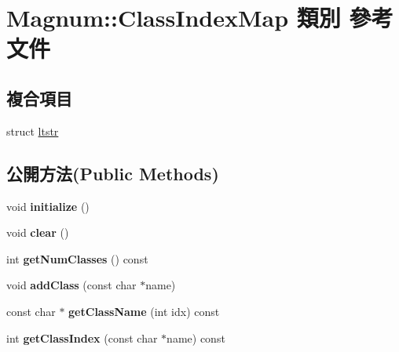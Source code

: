 \hypertarget{class_magnum_1_1_class_index_map}{}\section{Magnum\+:\+:Class\+Index\+Map 類別 參考文件}
\label{class_magnum_1_1_class_index_map}
\subsection*{複合項目}
\begin{DoxyCompactItemize}
\item 
struct \hyperlink{struct_magnum_1_1_class_index_map_1_1ltstr}{ltstr}
\end{DoxyCompactItemize}
\subsection*{公開方法(Public Methods)}
\begin{DoxyCompactItemize}
\item 
void {\bfseries initialize} ()\hypertarget{class_magnum_1_1_class_index_map_a9abde835872cf39a0b240566cbe312ac}{}\label{class_magnum_1_1_class_index_map_a9abde835872cf39a0b240566cbe312ac}

\item 
void {\bfseries clear} ()\hypertarget{class_magnum_1_1_class_index_map_aa3c7d912fb4a6d11d869ae59a807628b}{}\label{class_magnum_1_1_class_index_map_aa3c7d912fb4a6d11d869ae59a807628b}

\item 
int {\bfseries get\+Num\+Classes} () const \hypertarget{class_magnum_1_1_class_index_map_a662f62e80e7e44fbe907372a2695009b}{}\label{class_magnum_1_1_class_index_map_a662f62e80e7e44fbe907372a2695009b}

\item 
void {\bfseries add\+Class} (const char $\ast$name)\hypertarget{class_magnum_1_1_class_index_map_a46ac4e8a263703c7538a2031d981b3a2}{}\label{class_magnum_1_1_class_index_map_a46ac4e8a263703c7538a2031d981b3a2}

\item 
const char $\ast$ {\bfseries get\+Class\+Name} (int idx) const \hypertarget{class_magnum_1_1_class_index_map_ad16fe94588cd8c25b1796054763b5855}{}\label{class_magnum_1_1_class_index_map_ad16fe94588cd8c25b1796054763b5855}

\item 
int {\bfseries get\+Class\+Index} (const char $\ast$name) const \hypertarget{class_magnum_1_1_class_index_map_ac570c5037088db6d99b810234f1bc86f}{}\label{class_magnum_1_1_class_index_map_ac570c5037088db6d99b810234f1bc86f}

\end{DoxyCompactItemize}
